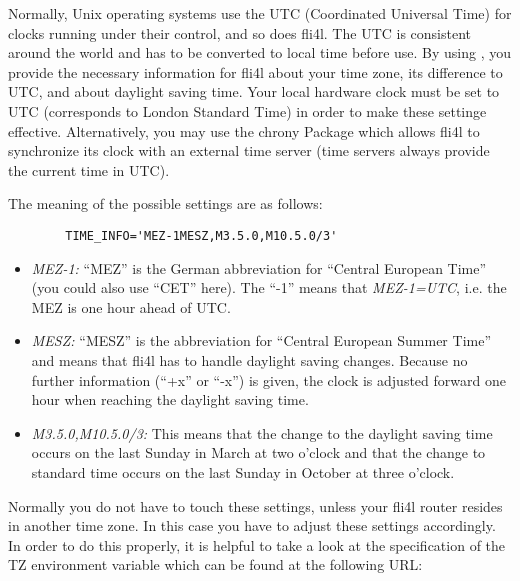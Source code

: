\begin{description}
  Normally, Unix operating systems use the UTC (Coordinated Universal Time)
  for clocks running under their control, and so does fli4l. The UTC is
  consistent around the world and has to be converted to local time before
  use. By using , you provide the necessary information for
  fli4l about your time zone, its difference to UTC, and about daylight
  saving time. Your local hardware clock must be set to UTC (corresponds to
  London Standard Time) in order to make these settinge effective.
  Alternatively, you may use the chrony Package which allows fli4l to
  synchronize its clock with an external time server (time servers always
  provide the current time in UTC).

  The meaning of the possible settings  are as
  follows:
\begin{example}
\begin{verbatim}
        TIME_INFO='MEZ-1MESZ,M3.5.0,M10.5.0/3'
\end{verbatim}
\end{example}
  \begin{itemize}
  \item \emph{MEZ-1:} ``MEZ'' is the German abbreviation for ``Central European
  Time'' (you could also use ``CET'' here). The ``-1'' means that \emph{MEZ-1=UTC},
  i.e. the MEZ is one hour ahead of UTC.
  \item \emph{MESZ:} ``MESZ'' is the abbreviation for ``Central European Summer
  Time'' and means that fli4l has to handle daylight saving changes.
  Because no further information (``+x'' or ``-x'') is given, the clock is
  adjusted forward one hour when reaching the daylight saving time.
  \item \emph{M3.5.0,M10.5.0/3:} This means that the change to the daylight
  saving time occurs on the last Sunday in March at two o'clock and that the
  change to standard time occurs on the last Sunday in October at three
  o'clock.
  \end{itemize}

  Normally you do not have to touch these settings, unless your fli4l router
  resides in another time zone. In this case you have to adjust these settings 
  accordingly. In order to do this properly, it is helpful to take a look at the
  specification of the TZ environment variable which can be found at the
  following URL:


\end{description}
